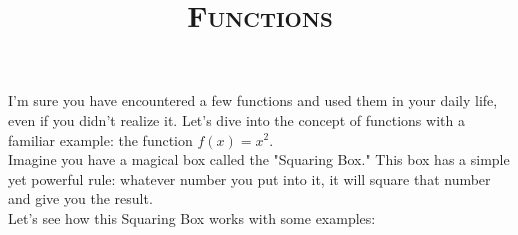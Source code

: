 \documentclass{article}
\title{\textsc{Functions}}
\begin{document}
\maketitle



I'm sure you have encountered a few functions and used them in your daily life, even if you didn't realize it. Let's dive into the concept of functions with a familiar example: the function \( f(x) = x^2 \).\\


Imagine you have a magical box called the "Squaring Box." This box has a simple yet powerful rule: whatever number you put into it, it will square that number and give you the result.\\[2mm]


Let's see how this Squaring Box works with some examples:
\end{document}
